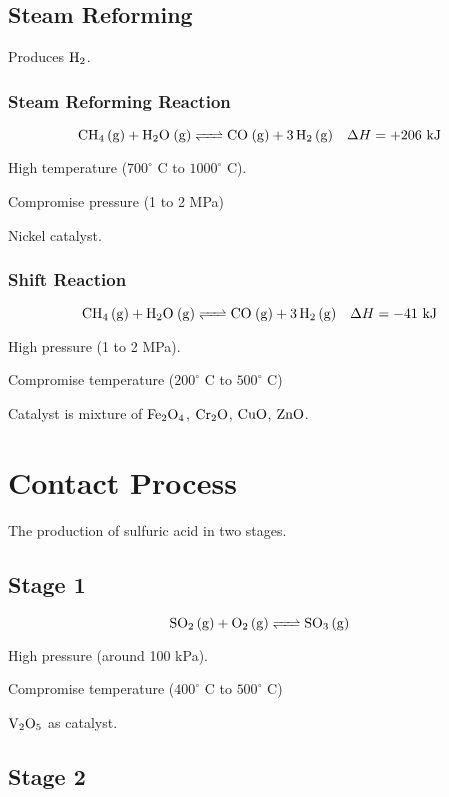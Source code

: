 \documentclass[a4paper,11pt]{article}
\begin{document}
\subsection{Steam Reforming}

Produces $\ce{H2}$.


\subsubsection{Steam Reforming Reaction}

$$
\ce{CH4 (g) + H2O (g) <=> CO (g) + 3H2 (g)} \quad \Delta H = +206\mbox{ kJ}
$$

High temperature ($700^\circ\text{ C}$ to $1000^\circ\text{ C}$).

Compromise pressure (1 to 2 MPa)

Nickel catalyst.


\subsubsection{Shift Reaction}

$$
\ce{CH4 (g) + H2O (g) <=> CO (g) + 3H2 (g)} \quad \Delta H = -41\mbox{ kJ}
$$

High pressure (1 to 2 MPa).

Compromise temperature ($200^\circ\text{ C}$ to $500^\circ\text{ C}$)

Catalyst is mixture of $\ce{Fe2O4}$, $\ce{Cr2O}$, $\ce{CuO}$, $\ce{ZnO}$.




\section{Contact Process}

The production of sulfuric acid in two stages.

\subsection{Stage 1}

$$
\ce{SO2 (g) + O2 (g) <=> SO3 (g)}
$$

High pressure (around 100 kPa).

Compromise temperature ($400^\circ\text{ C}$ to $500^\circ\text{ C}$)

$\ce{V2O5}$ as catalyst.


\subsection{Stage 2}
\end{document}

